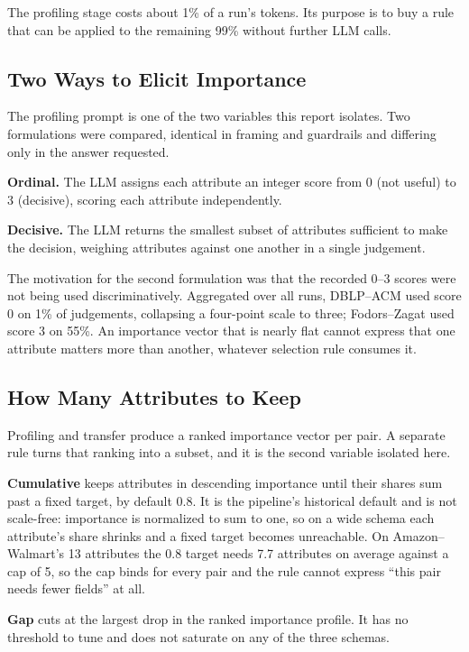 \documentclass[11pt]{article}
\begin{document}
The profiling stage costs about 1\% of a run's tokens. Its purpose is to buy a rule that can
be applied to the remaining 99\% without further LLM calls.

\subsection{Two Ways to Elicit Importance}
\label{sec:scoring}

The profiling prompt is one of the two variables this report isolates. Two formulations were
compared, identical in framing and guardrails and differing only in the answer requested.

\textbf{Ordinal.} The LLM assigns each attribute an integer score from 0 (not useful) to 3
(decisive), scoring each attribute independently.

\textbf{Decisive.} The LLM returns the smallest subset of attributes sufficient to make the
decision, weighing attributes against one another in a single judgement.

The motivation for the second formulation was that the recorded 0--3 scores were not being
used discriminatively. Aggregated over all runs, DBLP--ACM used score 0 on 1\% of
judgements, collapsing a four-point scale to three; Fodors--Zagat used score 3 on 55\%. An
importance vector that is nearly flat cannot express that one attribute matters more than
another, whatever selection rule consumes it.

\subsection{How Many Attributes to Keep}
\label{sec:policy}

Profiling and transfer produce a ranked importance vector per pair. A separate rule turns
that ranking into a subset, and it is the second variable isolated here.

\textbf{Cumulative} keeps attributes in descending importance until their shares sum past a
fixed target, by default 0.8. It is the pipeline's historical default and is not scale-free:
importance is normalized to sum to one, so on a wide schema each attribute's share shrinks
and a fixed target becomes unreachable. On Amazon--Walmart's 13 attributes the 0.8 target
needs 7.7 attributes on average against a cap of 5, so the cap binds for every pair and the
rule cannot express ``this pair needs fewer fields'' at all.

\textbf{Gap} cuts at the largest drop in the ranked importance profile. It has no threshold
to tune and does not saturate on any of the three schemas.
\end{document}

